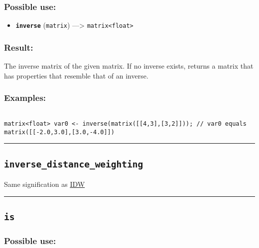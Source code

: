 \documentclass[]{book}
\providecommand{\tightlist}{%
  \setlength{\itemsep}{0pt}\setlength{\parskip}{0pt}}
\theoremstyle{definition}
\theoremstyle{definition}
\theoremstyle{definition}
\theoremstyle{remark}
\begin{document}
\subsubsection{Possible use:}\label{possible-use-283}

\begin{itemize}
\tightlist
\item
  \textbf{\texttt{inverse}} (\texttt{matrix}) ---\textgreater{}
  \texttt{matrix\textless{}float\textgreater{}}
\end{itemize}

\subsubsection{Result:}\label{result-273}

The inverse matrix of the given matrix. If no inverse exists, returns a
matrix that has properties that resemble that of an inverse.

\subsubsection{Examples:}\label{examples-213}

\begin{verbatim}
 
matrix<float> var0 <- inverse(matrix([[4,3],[3,2]])); // var0 equals matrix([[-2.0,3.0],[3.0,-4.0]])
\end{verbatim}

\begin{center}\rule{0.5\linewidth}{\linethickness}\end{center}

\subsection{\texorpdfstring{\texttt{inverse\_distance\_weighting}}{inverse\_distance\_weighting}}\label{inverse_distance_weighting}

Same signification as \href{OperatorsIM\#IDW}{IDW}

\begin{center}\rule{0.5\linewidth}{\linethickness}\end{center}

\subsection{\texorpdfstring{\texttt{is}}{is}}\label{is}

\subsubsection{Possible use:}\label{possible-use-284}
\end{document}
